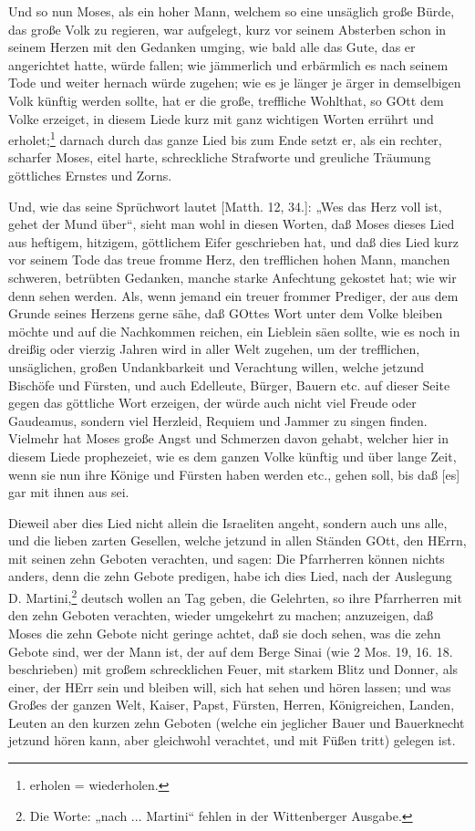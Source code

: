 Und so nun Moses, als ein hoher Mann, welchem so eine unsäglich große Bürde, das große Volk zu regieren, war aufgelegt, kurz vor seinem Absterben schon in seinem Herzen mit den Gedanken umging, wie bald alle das Gute, das er angerichtet hatte, würde fallen; wie jämmerlich und erbärmlich es nach seinem Tode und weiter hernach würde zugehen; wie es je länger je ärger in demselbigen Volk künftig werden sollte, hat er die große, treffliche Wohlthat, so GOtt dem Volke erzeiget, in diesem Liede kurz mit ganz wichtigen Worten errührt und erholet;\footnote{erholen = wiederholen.} darnach durch das ganze Lied bis zum Ende setzt er, als ein rechter, scharfer Moses, eitel harte, schreckliche Strafworte und greuliche Träumung göttliches Ernstes und Zorns.

Und, wie das seine Sprüchwort lautet [Matth. 12, 34.]: „Wes das Herz voll ist, gehet der Mund über“, sieht man wohl in diesen Worten, daß Moses dieses Lied aus heftigem, hitzigem, göttlichem Eifer geschrieben hat, und daß dies Lied kurz vor seinem Tode das treue fromme Herz, den trefflichen hohen Mann, manchen schweren, betrübten Gedanken, manche starke Anfechtung gekostet hat; wie wir denn sehen werden. Als, wenn jemand ein treuer frommer Prediger, der aus dem Grunde seines Herzens gerne sähe, daß GOttes Wort unter dem Volke bleiben möchte und auf die Nachkommen reichen, ein Lieblein säen sollte, wie es noch in dreißig oder vierzig Jahren wird in aller Welt zugehen, um der trefflichen, unsäglichen, großen Undankbarkeit und Verachtung willen, welche jetzund Bischöfe und Fürsten, und auch Edelleute, Bürger, Bauern etc. auf dieser Seite gegen das göttliche Wort erzeigen, der würde auch nicht viel Freude oder Gaudeamus, sondern viel Herzleid, Requiem und Jammer zu singen finden. Vielmehr hat Moses große Angst und Schmerzen davon gehabt, welcher hier in diesem Liede prophezeiet, wie es dem ganzen Volke künftig und über lange Zeit, wenn sie nun ihre Könige und Fürsten haben werden etc., gehen soll, bis daß [es] gar mit ihnen aus sei.

Dieweil aber dies Lied nicht allein die Israeliten angeht, sondern auch uns alle, und die lieben zarten Gesellen, welche jetzund in allen Ständen GOtt, den HErrn, mit seinen zehn Geboten verachten, und sagen: Die Pfarrherren können nichts anders, denn die zehn Gebote predigen, habe ich dies Lied, nach der Auslegung D. Martini,\footnote{Die Worte: „nach ... Martini“ fehlen in der Wittenberger Ausgabe.} deutsch wollen an Tag geben, die Gelehrten, so ihre Pfarrherren mit den zehn Geboten verachten, wieder umgekehrt zu machen; anzuzeigen, daß Moses die zehn Gebote nicht geringe achtet, daß sie doch sehen, was die zehn Gebote sind, wer der Mann ist, der auf dem Berge Sinai (wie 2 Mos. 19, 16. 18. beschrieben) mit großem schrecklichen Feuer, mit starkem Blitz und Donner, als einer, der HErr sein und bleiben will, sich hat sehen und hören lassen; und was Großes der ganzen Welt, Kaiser, Papst, Fürsten, Herren, Königreichen, Landen, Leuten an den kurzen zehn Geboten (welche ein jeglicher Bauer und Bauerknecht jetzund hören kann, aber gleichwohl verachtet, und mit Füßen tritt) gelegen ist.

